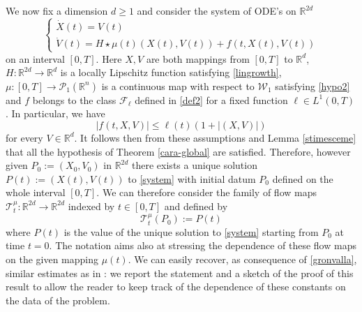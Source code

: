 \documentclass[11pt]{article}
\theoremstyle{plain}
\theoremstyle{definition}
\theoremstyle{remark}
\numberwithin{equation}{section}
\newcommand{\R}{{\mathbb R}}
\newcommand{\PP}{{\mathcal P}_1}
\newcommand{\WW}{{\mathcal W}_1}
\begin{document}
We now fix a dimension $d \ge 1$ and consider the system of ODE's on $\R^{2d}$
\begin{equation}\label{system}
\begin{cases}
\dot X(t)=V(t)\\
\dot V(t)= H\star \mu(t) (X(t), V(t))+ f(t, X(t), V(t))
\end{cases}
\end{equation}
on an interval $[0, T]$. Here $X, V$ are both mappings from $[0, T]$ to $\R^d$, $H\colon \R^{2d} \to \R^{d}$ is a locally Lipschitz function satisfying \eqref{lingrowth}, $\mu\colon[0,T]\to \PP(\R^n)$ is a continuous map with respect to $\WW$ satisfying \eqref{hypo2} and $f$ belongs to the class ${\mathcal F}_\ell$ defined in \eqref{def2} for a fixed function $\ell \in L^1(0,T)$. In particular, we have
\begin{equation}\label{terr}
|f(t, X, V)|\le \ell(t)(1+|(X, V)|)
\end{equation}
for every $V \in \R^d$. It follows then from these assumptions and Lemma \ref{stimesceme} that all the hypothesis of Theorem \ref{cara-global} are satisfied. Therefore, however given $P_0:=(X_0, V_0)$ in $\R^{2d}$ there exists a unique solution $P(t):=(X(t), V(t))$ to \eqref{system} with initial datum $P_0$ defined on the whole interval $[0, T]$. We can therefore consider the family of flow maps ${\mathcal T}^\mu_t \colon \R^{2d} \to \R^{2d}$ indexed by $t\in [0,T]$ and defined by
\begin{equation}\label{definitflow}
{\mathcal T}^\mu_t(P_0):=P(t)
\end{equation}
where $P(t)$ is the value of the unique solution to \eqref{system} starting from $P_0$ at time $t=0$. The notation aims also at stressing the dependence of these flow maps on the given mapping $\mu(t)$. %
We can easily recover, as consequence of \eqref{gronvalla}, similar estimates as in \cite[Lemmas 3.7 and 3.8]{CanCarRos10}: we report the statement and a sketch of the proof of this result to allow the reader to keep track of the dependence of these constants on the data of the problem.
\end{document}

